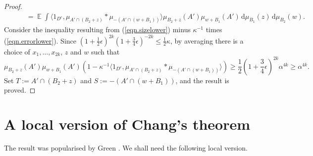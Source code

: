 \documentclass[12pt,reqno]{amsart}
\providecommand{\E}{\mathop{\mathbb{E}}}
\newcommand{\dd}{\,\mathrm{d}}
\numberwithin{equation}{section}
\begin{document}
\begin{proof}
\begin{align}
&\label{eqn.errorlower} \qquad  = \E{ \int{\langle 1_{D^c},\mu_{A' \cap (B_2+z)} \ast \mu_{-(A' \cap (w+B_1))}\rangle\mu_{B_2+z}(A')\mu_{w+B_1}(A') \dd \mu_{B_1}(z)\dd \mu_{B_2}(w)}}.
 \end{align}
Consider the inequality resulting from (\ref{eqn.sizelower}) minus $\kappa^{-1}$ times (\ref{eqn.errorlower}). Since $(1+\frac{1}{2}\epsilon)^{2k}(1+\frac{3}{4}\epsilon)^{-2k} \leq \frac{1}{2}\kappa$, by averaging there is a choice of $x_1,\dots,x_{2k}$, $z$ and $w$ such that
 \begin{equation*}
 \mu_{B_2+z}(A')\mu_{w+B_1}(A')(1 -\kappa^{-1}\langle 1_{D^c},\mu_{A' \cap (B_2+z)} \ast \mu_{-(A' \cap (w+B_1))}\rangle) \geq \frac{1}{2}\left(1+\frac{3}{4}\epsilon\right)^{2k}\alpha^{4k}\geq \alpha^{4k}.
 \end{equation*}
 Set $T:=A' \cap (B_2+z)$ and $S:=-(A' \cap (w+B_1))$, and the result is proved.
\end{proof}

\section{A local version of Chang's theorem}\label{ap.chang}

The result \cite[Lemma 3.1]{cha::0} was popularised by Green \cite{gre::6}. We shall need the following local version.
\end{document}

